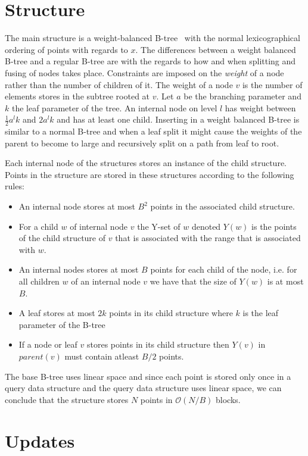 \documentclass[twoside,11pt,openright]{report}
\begin{document}
\section{Structure}
The main structure is a weight-balanced B-tree~\cite{arge_vitter_1996} with the normal lexicographical ordering of points with regards to $x$. The differences between a weight balanced B-tree and a regular B-tree are with the regards to how and when splitting and fusing of nodes takes place. Constraints are imposed on the \textit{weight} of a node rather than the number of children of it. The weight of a node $v$ is the number of elements stores in the subtree rooted at $v$. Let $a$ be the branching parameter and $k$ the leaf parameter of the tree. An internal node on level $l$ has weight between $\frac{1}{2}a^lk$ and $2a^lk$ and has at least one child. Inserting in a weight balanced B-tree is similar to a normal B-tree and when a leaf split it might cause the weights of the parent to become to large and recursively split on a path from leaf to root.

Each internal node of the structures stores an instance of the child structure. Points in the structure are stored in these structures according to the following rules:
\begin{itemize}
	\item{An internal node stores at most $B^2$ points in the associated child structure.}
	\item{For a child $w$ of internal node $v$ the Y-set of $w$ denoted $Y(w)$ is the points of the child structure of $v$ that is associated with the range that is associated with $w$.}
	\item{An internal nodes stores at most $B$ points for each child of the node, i.e. for all children $w$ of an internal node $v$ we have that the size of $Y(w)$ is at most $B$.}
	\item{A leaf stores at most $2k$ points in its child structure where $k$ is the leaf parameter of the B-tree}
	\item{If a node or leaf $v$ stores points in its child structure then $Y(v)$ in $parent(v)$ must contain atleast $B/2$ points.}
\end{itemize}

The base B-tree uses linear space and since each point is stored only once in a query data structure and the query data structure uses linear space, we can conclude that the structure stores $N$ points in $\mathcal{O}(N/B)$ blocks.

\section{Updates}
\label{sec:arge_updates}
\end{document}
